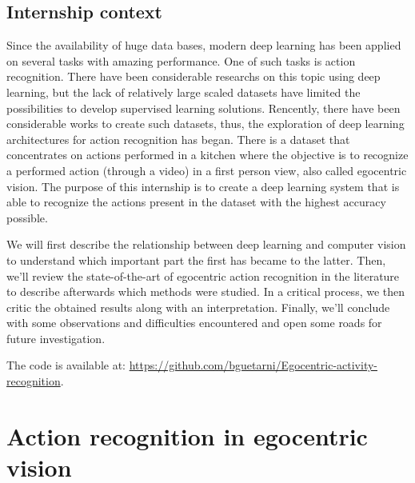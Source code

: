 \documentclass[12pt, a4paper]{report}
\begin{document}
		\section{Internship context}
			Since the availability of huge data bases, modern deep learning has been applied on several tasks with amazing performance.
			One of such tasks is action recognition.
			There have been considerable researchs on this topic using deep learning, but the lack of relatively large scaled datasets have limited the possibilities to develop supervised learning solutions.
			Rencently, there have been considerable works to create such datasets, thus, the exploration of deep learning architectures for action recognition has began.
			There is a dataset that concentrates on actions performed in a kitchen where the objective is to recognize a performed action (through a video) in a first person view, also called egocentric vision.
			The purpose of this internship is to create a deep learning system that is able to recognize the actions present in the dataset with the highest accuracy possible.
			\par
			\bigbreak
			We will first describe the relationship between deep learning and computer vision to understand which important part the first has became to the latter.
			Then, we'll review the state-of-the-art of egocentric action recognition in the literature to describe afterwards which methods were studied.
			In a critical process, we then critic the obtained results along with an interpretation.
			Finally, we'll conclude with some observations and difficulties encountered and open some roads for future investigation.
			\par
			\bigbreak
			The code is available at: \url{https://github.com/bguetarni/Egocentric-activity-recognition}.
	\chapter{Action recognition in egocentric vision}
\end{document}

